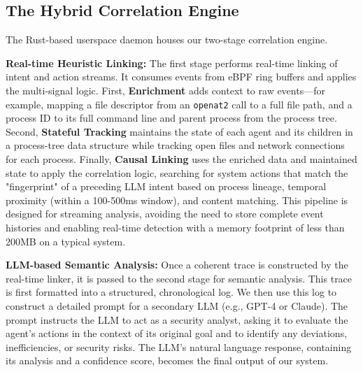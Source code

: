 \subsection{The Hybrid Correlation Engine}
The Rust-based userspace daemon houses our two-stage correlation engine.

\textbf{Real-time Heuristic Linking:} The first stage performs real-time linking of intent and action streams. It consumes events from eBPF ring buffers and applies the multi-signal logic. First, \textbf{Enrichment} adds context to raw events—for example, mapping a file descriptor from an \texttt{openat2} call to a full file path, and a process ID to its full command line and parent process from the process tree. Second, \textbf{Stateful Tracking} maintains the state of each agent and its children in a process-tree data structure while tracking open files and network connections for each process. Finally, \textbf{Causal Linking} uses the enriched data and maintained state to apply the correlation logic, searching for system actions that match the "fingerprint" of a preceding LLM intent based on process lineage, temporal proximity (within a 100-500ms window), and content matching. This pipeline is designed for streaming analysis, avoiding the need to store complete event histories and enabling real-time detection with a memory footprint of less than 200MB on a typical system.

\textbf{LLM-based Semantic Analysis:} Once a coherent trace is constructed by the real-time linker, it is passed to the second stage for semantic analysis. This trace is first formatted into a structured, chronological log. We then use this log to construct a detailed prompt for a secondary LLM (e.g., GPT-4 or Claude). The prompt instructs the LLM to act as a security analyst, asking it to evaluate the agent's actions in the context of its original goal and to identify any deviations, inefficiencies, or security risks. The LLM's natural language response, containing its analysis and a confidence score, becomes the final output of our system. 